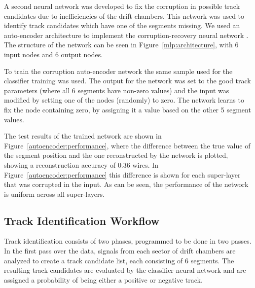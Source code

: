 \documentclass{webofc}
\begin{document}
A second neural network was developed to fix the corruption in possible track candidates due to 
inefficiencies of the drift chambers. This network was used to identify track candidates which have one of 
the segments missing. We used an auto-encoder architecture to implement the corruption-recovery 
neural network \cite{Gavalian:2020xmc}. The structure of the network can be seen in 
Figure~\ref{mlp:architecture}, with 6 input nodes and 6 output nodes.

To train the corruption auto-encoder network the same sample used for the classifier training was used.
The output for the network was set to the good track parameters (where all 6 segments have non-zero values) 
and the input was modified by setting one of the nodes (randomly) to zero. The network learns to fix the node 
containing zero, by assigning it a value based on the other 5 segment values. 

The test results of the trained network are shown in Figure~\ref{autoencoder:performance}, where the 
difference between the true value of the segment position and the one reconstructed by the network is 
plotted, showing a reconstruction accuracy of $0.36$ wires. In Figure~\ref{autoencoder:performance} 
this difference is shown for each super-layer that was corrupted in the input. As can be seen, 
the performance of the network is uniform across all super-layers.

\subsection{Track Identification Workflow}
\label{track-identification-workflow}

 Track identification consists of two phases, programmed to be done in two passes. In the first pass 
 over the data, signals from each sector of drift chambers are analyzed to create a track candidate list, 
 each consisting of 6 segments. The resulting track candidates are evaluated by the classifier neural 
 network and are assigned a probability of being either a positive or negative track. 
 

\end{document}
